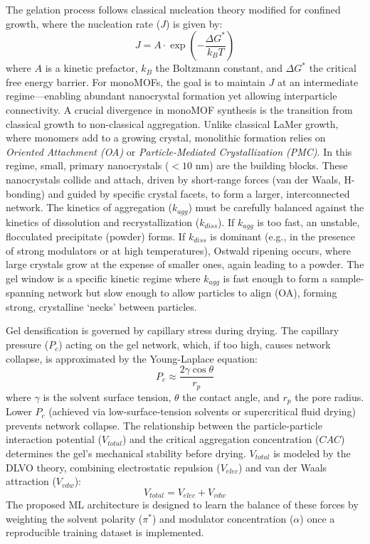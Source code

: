 \documentclass[12pt,a4paper]{article}
\begin{document}
The gelation process follows classical nucleation theory modified for confined growth, where the nucleation rate ($J$) is given by:
\[
J = A \cdot \exp\left(-\frac{\Delta G^*}{k_B T}\right)
\]
where $A$ is a kinetic prefactor, $k_B$ the Boltzmann constant, and $\Delta G^*$ the critical free energy barrier. For monoMOFs, the goal is to maintain $J$ at an intermediate regime—enabling abundant nanocrystal formation yet allowing interparticle connectivity. A crucial divergence in monoMOF synthesis is the transition from classical growth to non-classical aggregation. Unlike classical LaMer growth, where monomers add to a growing crystal, monolithic formation relies on \textit{Oriented Attachment (OA)} or \textit{Particle-Mediated Crystallization (PMC)}. In this regime, small, primary nanocrystals ($<10$ nm) are the building blocks. These nanocrystals collide and attach, driven by short-range forces (van der Waals, H-bonding) and guided by specific crystal facets, to form a larger, interconnected network.\cite{ref50} The kinetics of aggregation ($k_{agg}$) must be carefully balanced against the kinetics of dissolution and recrystallization ($k_{diss}$). If $k_{agg}$ is too fast, an unstable, flocculated precipitate (powder) forms. If $k_{diss}$ is dominant (e.g., in the presence of strong modulators or at high temperatures), Ostwald ripening occurs, where large crystals grow at the expense of smaller ones, again leading to a powder. The gel window is a specific kinetic regime where $k_{agg}$ is fast enough to form a sample-spanning network but slow enough to allow particles to align (OA), forming strong, crystalline `necks' between particles.

Gel densification is governed by capillary stress during drying. The capillary pressure ($P_c$) acting on the gel network, which, if too high, causes network collapse, is approximated by the Young-Laplace equation:
\[
P_c \approx \frac{2 \gamma \cos\theta}{r_p}
\]
where $\gamma$ is the solvent surface tension, $\theta$ the contact angle, and $r_p$ the pore radius. Lower $P_c$ (achieved via low-surface-tension solvents or supercritical fluid drying) prevents network collapse. The relationship between the particle-particle interaction potential ($V_{total}$) and the critical aggregation concentration ($CAC$) determines the gel's mechanical stability before drying. $V_{total}$ is modeled by the DLVO theory, combining electrostatic repulsion ($V_{elec}$) and van der Waals attraction ($V_{vdw}$):
\[
V_{total} = V_{elec} + V_{vdw}
\]
The proposed ML architecture is designed to learn the balance of these forces by weighting the solvent polarity ($\pi^*$) and modulator concentration ($\alpha$) once a reproducible training dataset is implemented.
\end{document}
